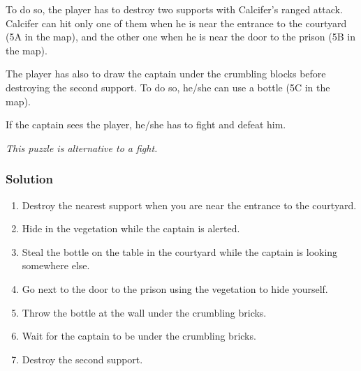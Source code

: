 To do so, the player has to destroy two supports with Calcifer's ranged attack. Calcifer can hit only one of them when he is near the entrance to the courtyard (5A in the map), and the other one when he is near the door to the prison (5B in the map).

The player has also to draw the captain under the crumbling blocks before destroying the second support. To do so, he/she can use a bottle (5C in the map).

If the captain sees the player, he/she has to fight and defeat him.

\textit{This puzzle is alternative to a fight.}

\subsubsection*{Solution}
\begin{enumerate}
	\item Destroy the nearest support when you are near the entrance to the courtyard.
	\item Hide in the vegetation while the captain is alerted.
	\item Steal the bottle on the table in the courtyard while the captain is looking somewhere else.
	\item Go next to the door to the prison using the vegetation to hide yourself.
	\item Throw the bottle at the wall under the crumbling bricks.
	\item Wait for the captain to be under the crumbling bricks.
	\item Destroy the second support.
\end{enumerate}
